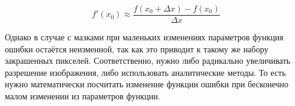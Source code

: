 \documentclass[11pt]{article}
\begin{document}
\begin{itemize}
                \begin{equation}
                    f'(x_0) \approx \frac{f(x_0 + \Delta x) - f(x_0)}{\Delta x}
                \end{equation}

                Однако в случае с мазками при маленьких изменениях параметров функция ошибки остаётся неизменной, так как это приводит к такому же набору закрашенных пикселей.
                Соответственно, нужно либо радикально увеличивать разрешение изображения, либо использовать аналитические методы.
                То есть нужно математически посчитать изменение функции ошибки при бесконечно малом изменении из параметров функции.


    \end{itemize}
\end{document}
